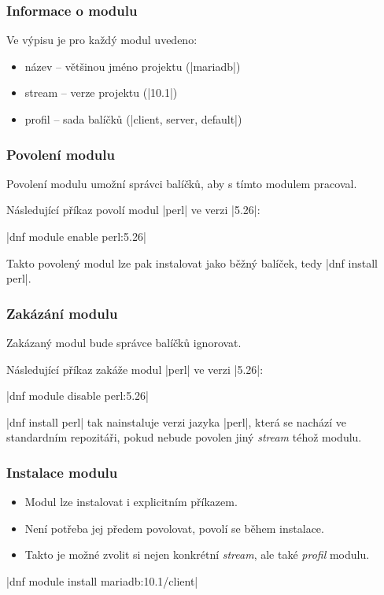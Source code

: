 \documentclass[12pt]{beamer}
\begin{document}
\begin{frame}[fragile]
\frametitle{Informace o modulu}
Ve výpisu je pro každý modul uvedeno:

\begin{itemize}
	\item název -- většinou jméno projektu (\tc|mariadb|)
	\item stream -- verze projektu (\tc|10.1|)
	\item profil -- sada balíčků (\tc|client, server, default|)
\end{itemize}
\end{frame}

\begin{frame}[fragile]
\frametitle{Povolení modulu}
Povolení modulu umožní správci balíčků, aby s tímto modulem pracoval. 

Následující příkaz povolí modul \tc|perl| ve verzi \tc|5.26|:

\begin{center}
	\tc|dnf module enable perl:5.26|
\end{center}

Takto povolený modul lze pak instalovat jako běžný balíček, tedy \tc|dnf install perl|.
\end{frame}

\begin{frame}[fragile]
\frametitle{Zakázání modulu}
Zakázaný modul bude správce balíčků ignorovat. 

Následující příkaz zakáže modul \tc|perl| ve verzi \tc|5.26|:

\begin{center}
	\tc|dnf module disable perl:5.26|
\end{center}

\tc|dnf install perl| tak nainstaluje verzi jazyka \tc|perl|, která se nachází ve standardním repozitáři, pokud nebude povolen jiný \textit{stream} téhož modulu.
\end{frame}

\begin{frame}[fragile]
\frametitle{Instalace modulu}

\begin{itemize}
	\item Modul lze instalovat i explicitním příkazem.
	\item Není potřeba jej předem povolovat, povolí se během instalace.
	\item Takto je možné zvolit si nejen konkrétní \textit{stream}, ale také \textit{profil} modulu.
\end{itemize}

\begin{center}
	\tc|dnf module install mariadb:10.1/client|
\end{center}

\end{frame}
\end{document}

